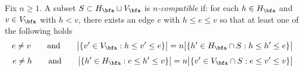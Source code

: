   \begin{definition}
    Fix $n\ge1$.
    A subset $S\subset H_\bfa\sqcup V_\bfa$ is \emph{$n$-compatible} if: for each $h\in H_\bfa$ and $v\in V_\bfa$ with $h<v$, there exists an edge $e$ with $h\le e\le v$ so that at least one of the following holds
    \[e\ne v \qquad \text{and} \qquad \big|\{v'\in V_\bfa:h\le v'\le e\}\big|=n\big|\{h'\in H_\bfa\cap S:h\le h'\le e\}\big|\]
    \[e\ne h \qquad \text{and} \qquad \big|\{h'\in H_\bfa:e\le h'\le v\}\big|=n\big|\{v'\in V_\bfa\cap S:e\le v'\le v\}\big|\]
  \end{definition}


